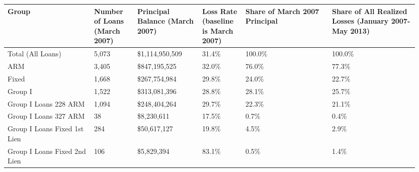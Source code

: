\begin{longtable}{|p{0.2\linewidth}|p{0.1\linewidth}|p{0.15\linewidth}|p{0.1\linewidth}|p{0.2\linewidth}|p{0.2\linewidth}|}
\hline
Group & \textbf{Number of Loans (March 2007)} & \textbf{Principal Balance (March 2007)} & \textbf{Loss Rate (baseline is March 2007)} & \textbf{Share of March 2007 Principal} & \textbf{Share of All Realized Losses (January 2007-May 2013)} \\
\hline
Total (All Loans)                          &                        5,073 &                 \$1,114,950,509 &                              31.4\% &                        100.0\% &                                             100.0\% \\
\hline
ARM                                        &                        3,405 &                   \$847,195,525 &                              32.0\% &                         76.0\% &                                              77.3\% \\
\hline
Fixed                                      &                        1,668 &                   \$267,754,984 &                              29.8\% &                         24.0\% &                                              22.7\% \\
\hline
Group I                                    &                        1,522 &                   \$313,081,396 &                              28.8\% &                         28.1\% &                                              25.7\% \\
\hline
Group I Loans 228 ARM                      &                        1,094 &                   \$248,404,264 &                              29.7\% &                         22.3\% &                                              21.1\% \\
\hline
Group I Loans 327 ARM                      &                           38 &                     \$8,230,611 &                              17.5\% &                          0.7\% &                                               0.4\% \\
\hline
Group I Loans Fixed 1st Lien               &                          284 &                    \$50,617,127 &                              19.8\% &                          4.5\% &                                               2.9\% \\
\hline
Group I Loans Fixed 2nd Lien               &                          106 &                     \$5,829,394 &                              83.1\% &                          0.5\% &                                               1.4\% \\

\end{longtable}
